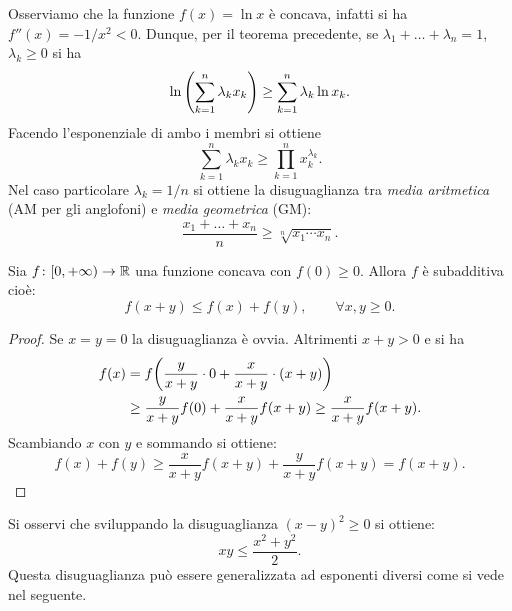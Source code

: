 \begin{example}
\label{ex:AMGM}%
  \mymark{*}%
%
Osserviamo che la funzione $f(x) = \ln x$ è concava, infatti si ha
$f''(x) = -1/x^2 < 0$. Dunque, per il teorema precedente, se $\lambda_1 + \dots + \lambda_n =1$, $\lambda_k \ge 0$ si ha
\[
    \ln{\left( \sum_{k=1}^n \lambda_k x_k \right)}
    \ge \sum_{k=1}^n \lambda_k \ln x_k.
\]
Facendo l'esponenziale di ambo i membri si ottiene
\[
  \sum_{k=1}^n \lambda_k x_k \ge \prod_{k=1}^n x_k^{\lambda_k}.
\]
Nel caso particolare $\lambda_k = 1/n$ si ottiene
la disuguaglianza tra \emph{media aritmetica} (AM per gli anglofoni)
e \emph{media geometrica}
%
%
%
%
%
%
(GM):
\[
  \frac{x_1 + \dots + x_n}{n} \ge \sqrt[n]{x_1\cdots x_n}.
\]
\end{example}

\begin{exercise}
%
%
%
Sia $f\colon [0,+\infty) \to {\mathbb R}$ una funzione concava con $f(0)\ge 0$. Allora $f$ è subadditiva cioè:
\[
  f(x+y) \le f(x) + f(y),\qquad \forall x,y\ge 0.
\]
\end{exercise}
%
\begin{proof}
Se $x=y=0$ la disuguaglianza è ovvia.
Altrimenti $x+y>0$ e si ha
\begin{align*}
f(x) &= f{\left( \frac{y}{x+y}\cdot 0 + \frac{x}{x+y}\cdot (x+y) \right)}\\ &\ge \frac{y}{x+y}f(0) + \frac{x}{x+y}f(x+y)
\ge \frac{x}{x+y}f(x+y).
\end{align*}
Scambiando $x$ con $y$ e sommando si ottiene:
\[
  f(x) + f(y) \ge \frac{x}{x+y}f(x+y) + \frac{y}{x+y}f(x+y) = f(x+y).
\]
\end{proof}

Si osservi che sviluppando la disuguaglianza $(x-y)^2\ge 0$ si ottiene:
\[
  x y \le \frac{x^2 + y^2}{2}.
\]
Questa disuguaglianza può essere generalizzata ad esponenti diversi 
come si vede nel seguente.

